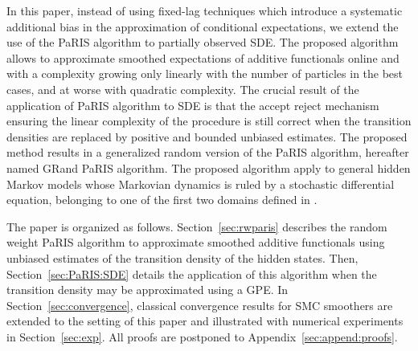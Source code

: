 \documentclass[12pt,draft]{article}
\newcommand{\1}{\mathrm{1}}
\begin{document}
In this paper, instead of using fixed-lag techniques which introduce a systematic additional bias in the approximation of conditional expectations, we extend the use of  the PaRIS algorithm to partially observed SDE. 
The proposed algorithm allows to approximate smoothed expectations of additive functionals online and with a complexity growing only linearly with the number of particles in the best cases, and at worse with quadratic complexity. 
The crucial result of the application of PaRIS algorithm to SDE is that the accept reject mechanism ensuring the linear complexity of the procedure is still correct when the transition densities are replaced by positive and bounded unbiased estimates. The proposed method results in a generalized random version of the PaRIS algorithm, hereafter named GRand PaRIS algorithm. The proposed algorithm apply to general hidden Markov models whose Markovian dynamics is ruled by a stochastic differential equation, belonging to one of the first two domains defined in \cite{beskos:papaspiliopoulos:roberts:fearnhead:2006}.

The paper is organized as follows. Section~\ref{sec:rwparis} describes the random weight PaRIS algorithm to approximate smoothed additive functionals using unbiased estimates of the transition density of the hidden states. 
Then, Section~\ref{sec:PaRIS:SDE} details the application of this algorithm when the transition density may be approximated using a GPE. 
In Section~\ref{sec:convergence}, classical convergence results for SMC smoothers are extended to the setting of this paper and illustrated with numerical experiments in Section~\ref{sec:exp}. 
All proofs are postponed to Appendix~\ref{sec:append:proofs}.
\end{document}
